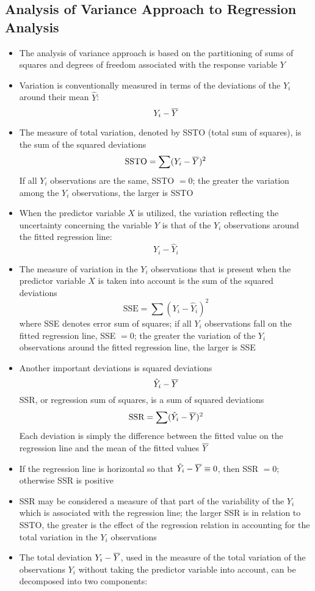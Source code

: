 \subsection{Analysis of Variance Approach to Regression Analysis}
\begin{itemize}
\item The analysis of variance approach is based on the partitioning of sums of squares and degrees of freedom associated with the response variable $Y$ 
\item Variation is conventionally measured in terms of the deviations of the $Y_i$ around their mean $\hat{Y}$: $$ Y_i - \overline{Y} $$ 
\item The measure of total variation, denoted by SSTO (total sum of squares), is the sum of the squared deviations $$ \text{SSTO} = \sum (Y_i - \overline{Y})^2 $$ If all $Y_i$ observations are the same, SSTO $= 0$; the greater the variation among the $Y_i$ observations, the larger is SSTO
\item When the predictor variable $X$ is utilized, the variation reflecting the uncertainty concerning the variable $Y$ is that of the $Y_i$ observations around the fitted regression line: $$ Y_i - \hat{Y}_i $$ 
\item The measure of variation in the $Y_i$ observations that is present when the predictor variable $X$ is taken into account is the sum of the squared deviations $$ \text{SSE} = \sum (Y_i - \hat{Y}_i)^2 $$ where SSE denotes error sum of squares; if all $Y_i$ observations fall on the fitted regression line, SSE $=0$; the greater the variation of the $Y_i$ observations around the fitted regression line, the larger is SSE
\item Another important deviations is squared deviations $$ \hat{Y}_i - \overline{Y} $$ SSR, or regression sum of squares, is a sum of squared deviations $$ \text{SSR} = \sum (\hat{Y}_i - \overline{Y})^2 $$ Each deviation is simply the difference between the fitted value on the regression line and the mean of the fitted values $\overline{Y}$
\item If the regression line is horizontal so that $\hat{Y}_i - \overline{Y} \equiv 0$, then SSR $=0$; otherwise SSR is positive
\item SSR may be considered a measure of that part of the variability of the $Y_i$ which is associated with the regression line; the larger SSR is in relation to SSTO, the greater is the effect of the regression relation in accounting for the total variation in the $Y_i$ observations 
\item The total deviation $Y_i - \overline{Y}$, used in the measure of the total variation of the observations $Y_i$ without taking the predictor variable into account, can be decomposed into two components: 

\end{itemize}
